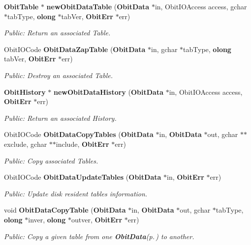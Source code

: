 \begin{CompactItemize}
{\bf Obit\-Table} $\ast$ {\bf new\-Obit\-Data\-Table} ({\bf Obit\-Data} $\ast$in, Obit\-IOAccess access, gchar $\ast$tab\-Type, {\bf olong} $\ast$tab\-Ver, {\bf Obit\-Err} $\ast$err)
\begin{CompactList}\small\item\em Public: Return an associated Table. \item\end{CompactList}\item 
Obit\-IOCode {\bf Obit\-Data\-Zap\-Table} ({\bf Obit\-Data} $\ast$in, gchar $\ast$tab\-Type, {\bf olong} tab\-Ver, {\bf Obit\-Err} $\ast$err)
\begin{CompactList}\small\item\em Public: Destroy an associated Table. \item\end{CompactList}\item 
{\bf Obit\-History} $\ast$ {\bf new\-Obit\-Data\-History} ({\bf Obit\-Data} $\ast$in, Obit\-IOAccess access, {\bf Obit\-Err} $\ast$err)
\begin{CompactList}\small\item\em Public: Return an associated History. \item\end{CompactList}\item 
Obit\-IOCode {\bf Obit\-Data\-Copy\-Tables} ({\bf Obit\-Data} $\ast$in, {\bf Obit\-Data} $\ast$out, gchar $\ast$$\ast$exclude, gchar $\ast$$\ast$include, {\bf Obit\-Err} $\ast$err)
\begin{CompactList}\small\item\em Public: Copy associated Tables. \item\end{CompactList}\item 
Obit\-IOCode {\bf Obit\-Data\-Update\-Tables} ({\bf Obit\-Data} $\ast$in, {\bf Obit\-Err} $\ast$err)
\begin{CompactList}\small\item\em Public: Update disk resident tables information. \item\end{CompactList}\item 
void {\bf Obit\-Data\-Copy\-Table} ({\bf Obit\-Data} $\ast$in, {\bf Obit\-Data} $\ast$out, gchar $\ast$tab\-Type, {\bf olong} $\ast$inver, {\bf olong} $\ast$outver, {\bf Obit\-Err} $\ast$err)
\begin{CompactList}\small\item\em Public: Copy a given table from one {\bf Obit\-Data}{\rm (p.\,\pageref{structObitData})} to another. \item\end{CompactList}\item 

\end{CompactItemize}
